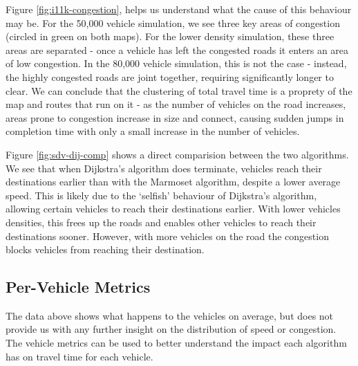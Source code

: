 \documentclass[ %
                    author={Alexander Hill},
                supervisor={Dr. Benjamin Sach},
                    degree={MEng},
                     title={MARMOSET},
                  subtitle={Multi-Agent Route Management using Online Simulation for Efficient Transportation},
                      type={research},
                      year={2016} ]{dissertation}
\begin{document}
Figure \ref{fig:i11k-congestion}, helps us understand what the cause of this
behaviour may be. For the 50,000 vehicle simulation, we see three key areas of
congestion (circled in green on both maps). For the lower density simulation,
these three areas are separated - once a vehicle has left the congested roads it
enters an area of low congestion. In the 80,000 vehicle simulation, this is not
the case - instead, the highly congested roads are joint together, requiring
significantly longer to clear.  We can conclude that the clustering of total
travel time is a proprety of the map and routes that run on it - as the number
of vehicles on the road increases, areas prone to congestion increase in size
and connect, causing sudden jumps in completion time with only a small increase
in the number of vehicles.

Figure \ref{fig:sdv-dij-comp} shows a direct comparision between the two
algorithms. We see that when Dijkstra's algorithm does terminate, vehicles reach
their destinations earlier than with the Marmoset algorithm, despite a lower
average speed. This is likely due to the `selfish' behaviour of Dijkstra's
algorithm, allowing certain vehicles to reach their destinations earlier. With
lower vehicles densities, this frees up the roads and enables other vehicles to
reach their destinations sooner. However, with more vehicles on the road the
congestion blocks vehicles from reaching their destination.

\subsection{Per-Vehicle Metrics}

The data above shows what happens to the vehicles on average, but does not
provide us with any further insight on the distribution of speed or congestion.
The vehicle metrics can be used to better understand the impact each algorithm
has on travel time for each vehicle.
\end{document}
